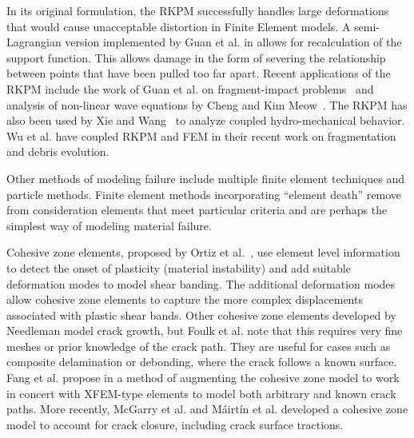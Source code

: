 In its original formulation, the RKPM successfully handles large deformations that would cause unacceptable distortion in Finite Element models.
A semi-Lagrangian version implemented by Guan et al. in \cite{guan2009semi} allows for recalculation of the support function.
This allows damage in the form of severing the relationship between points that have been pulled too far apart.
Recent applications of the RKPM include the work of Guan et al. on fragment-impact problems~\cite{guan2011semi} and analysis of non-linear wave equations by Cheng and Kim Meow~\cite{cheng2012analyzing}.
The RKPM has also been used by Xie and Wang~\cite{xie2014stabilized} to analyze coupled hydro-mechanical behavior.
Wu et al. have coupled RKPM and FEM in their recent work on fragmentation and debris evolution\cite{wu2014fragmentation}.

Other methods of modeling failure include multiple finite element techniques and particle methods.
Finite element methods incorporating ``element death'' remove from consideration elements that meet particular criteria and are perhaps the simplest way of modeling material failure.

Cohesive zone elements, proposed by Ortiz et al.~\cite{ortiz1987finite}, use element level information to detect the onset of plasticity (material instability) and add suitable deformation modes to model shear banding.
The additional deformation modes allow cohesive zone elements to capture the more complex displacements associated with plastic shear bands.
Other cohesive zone elements developed by Needleman\cite{needleman1987continuum} model crack growth, but Foulk et al.\cite{foulk2000formulation} note that this requires very fine meshes or prior knowledge of the crack path.
They are useful for cases such as composite delamination or debonding, where the crack follows a known surface.
Fang et al. propose in \cite{fang2011augmented} a method of augmenting the cohesive zone model to work in concert with XFEM-type elements to model both arbitrary and known crack paths.
More recently, McGarry et al. \cite{mcgarry2014potential} and M\'airt\'in et al. \cite{mairtin2014potential} developed a cohesive zone model to account for crack closure, including crack surface tractions.


